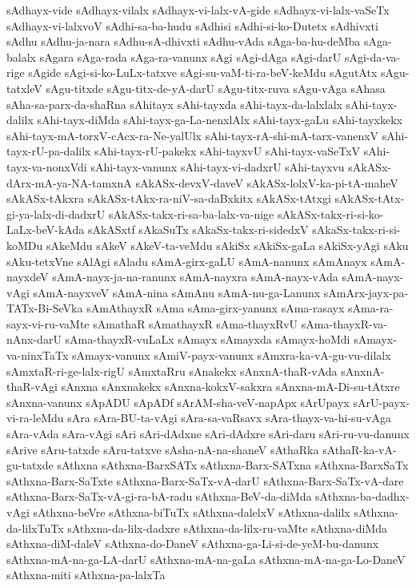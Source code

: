 {sAdhayx-vide
sAdhayx-vilalx
sAdhayx-vi-lalx-vA-gide
sAdhayx-vi-lalx-vaSeTx
sAdhayx-vi-lalxvoV
sAdhi-sa-ba-hudu
sAdhisi
sAdhi-si-ko-Dutetx
sAdhivxti
sAdhu
sAdhu-ja-nara
sAdhu-sA-dhivxti
sAdhu-vAda
sAga-ba-hu-deMba
sAga-balalx
sAgara
sAga-rada
sAga-ra-vanunx
sAgi
sAgi-dAga
sAgi-darU
sAgi-da-va-rige
sAgide
sAgi-si-ko-LuLx-tatxve
sAgi-su-vaM-ti-ra-beV-keMdu
sAgutAtx
sAgu-tatxleV
sAgu-titxde
sAgu-titx-de-yA-darU
sAgu-titx-ruva
sAgu-vAga
sAhasa
sAha-sa-parx-da-shaRna
sAhitayx
sAhi-tayxda
sAhi-tayx-da-lalxlalx
sAhi-tayx-dalilx
sAhi-tayx-diMda
sAhi-tayx-ga-La-nenxlAlx
sAhi-tayx-gaLu
sAhi-tayxkekx
sAhi-tayx-mA-torxV-cAcx-ra-Ne-yalUlx
sAhi-tayx-rA-shi-mA-tarx-vanenxV
sAhi-tayx-rU-pa-dalilx
sAhi-tayx-rU-pakekx
sAhi-tayxvU
sAhi-tayx-vaSeTxV
sAhi-tayx-va-nonxVdi
sAhi-tayx-vanunx
sAhi-tayx-vi-dadxrU
sAhi-tayxvu
sAkASx-dArx-mA-ya-NA-tamxnA
sAkASx-devxV-daveV
sAkASx-lolxV-ka-pi-tA-maheV
sAkASx-tAkxra
sAkASx-tAkx-ra-niV-sa-daBxkitx
sAkASx-tAtxgi
sAkASx-tAtx-gi-ya-lalx-di-dadxrU
sAkASx-takx-ri-sa-ba-lalx-va-nige
sAkASx-takx-ri-si-ko-LaLx-beV-kAda
sAkASxtf
sAkaSuTx
sAkaSx-takx-ri-sidedxV
sAkaSx-takx-ri-si-koMDu
sAkeMdu
sAkeV
sAkeV-ta-veMdu
sAkiSx
sAkiSx-gaLa
sAkiSx-yAgi
sAku
sAku-tetxVne
sAlAgi
sAladu
sAmA-girx-gaLU
sAmA-nanunx
sAmAnayx
sAmA-nayxdeV
sAmA-nayx-ja-na-ranunx
sAmA-nayxra
sAmA-nayx-vAda
sAmA-nayx-vAgi
sAmA-nayxveV
sAmA-nina
sAmAnu
sAmA-nu-ga-Lanunx
sAmArx-jayx-pa-TATx-Bi-SeVka
sAmAthayxR
sAma
sAma-girx-yanunx
sAma-rasayx
sAma-ra-sayx-vi-ru-vaMte
sAmathaR
sAmathayxR
sAma-thayxRvU
sAma-thayxR-va-nAnx-darU
sAma-thayxR-vuLaLx
sAmayx
sAmayxda
sAmayx-hoMdi
sAmayx-va-ninxTaTx
sAmayx-vanunx
sAmiV-payx-vanunx
sAmxra-ka-vA-gu-vu-dilalx
sAmxtaR-ri-ge-lalx-rigU
sAmxtaRru
sAnakekx
sAnxnA-thaR-vAda
sAnxnA-thaR-vAgi
sAnxna
sAnxnakekx
sAnxna-kokxV-sakxra
sAnxna-mA-Di-su-tAtxre
sAnxna-vanunx
sApADU
sApADf
sArAM-sha-veV-napApx
sArUpayx
sArU-payx-vi-ra-leMdu
sAra
sAra-BU-ta-vAgi
sAra-sa-vaRsavx
sAra-thayx-va-hi-su-vAga
sAra-vAda
sAra-vAgi
sAri
sAri-dAdxne
sAri-dAdxre
sAri-daru
sAri-ru-vu-danunx
sArive
sAru-tatxde
sAru-tatxve
sAsha-nA-na-shaneV
sAthaRka
sAthaR-ka-vA-gu-tatxde
sAthxna
sAthxna-BarxSATx
sAthxna-Barx-SATxna
sAthxna-BarxSaTx
sAthxna-Barx-SaTxte
sAthxna-Barx-SaTx-vA-darU
sAthxna-Barx-SaTx-vA-dare
sAthxna-Barx-SaTx-vA-gi-ra-bA-radu
sAthxna-BeV-da-diMda
sAthxna-ba-dadhx-vAgi
sAthxna-beVre
sAthxna-biTuTx
sAthxna-dalelxV
sAthxna-dalilx
sAthxna-da-lilxTuTx
sAthxna-da-lilx-dadxre
sAthxna-da-lilx-ru-vaMte
sAthxna-diMda
sAthxna-diM-daleV
sAthxna-do-DaneV
sAthxna-ga-Li-si-de-yeM-bu-danunx
sAthxna-mA-na-ga-LA-darU
sAthxna-mA-na-gaLa
sAthxna-mA-na-ga-Lo-DaneV
sAthxna-miti
sAthxna-pa-lalxTa
}
